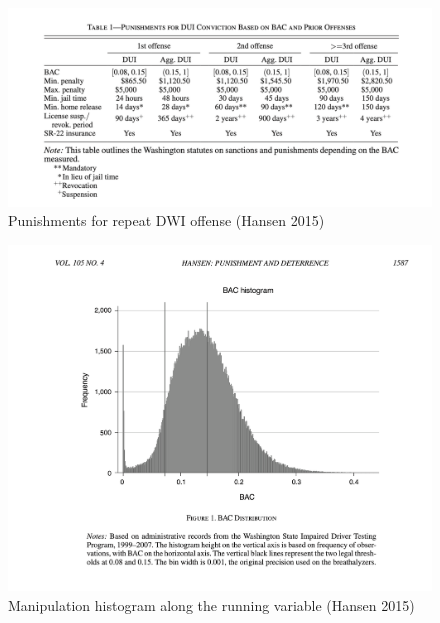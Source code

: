 \documentclass{beamer}
\begin{document}
\begin{frame}

	\begin{figure}
	\includegraphics[scale=0.35]{./lecture_includes/hansen_fig1}
	\caption{Punishments for repeat DWI offense (Hansen 2015)}
	\end{figure}
\end{frame}

\begin{frame}

	\begin{figure}
	\includegraphics[scale=0.35]{./lecture_includes/hansen_fig2}
	\caption{Manipulation histogram along the running variable (Hansen 2015)}
	\end{figure}
\end{frame}
\end{document}
